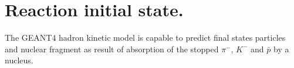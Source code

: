 \section{Reaction initial state.}

\hspace{1.0em} The GEANT4 hadron kinetic model is capable to predict 
final states particles and nuclear fragment
 as result of absorption of the stopped $\pi^{-}$, $K^{-}$ and 
$\bar{p}$ by a nucleus.

